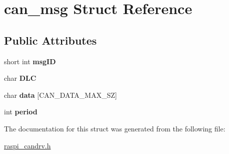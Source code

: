 \hypertarget{structcan__msg}{}\section{can\+\_\+msg Struct Reference}
\label{structcan__msg}
\subsection*{Public Attributes}
\begin{DoxyCompactItemize}
\item 
\hypertarget{structcan__msg_abde3c56b9f9aa29acf9b36df382b06bd}{}short int {\bfseries msg\+I\+D}\label{structcan__msg_abde3c56b9f9aa29acf9b36df382b06bd}

\item 
\hypertarget{structcan__msg_a7a0cd11dbedf7389a7c97b90f1aed6b7}{}char {\bfseries D\+L\+C}\label{structcan__msg_a7a0cd11dbedf7389a7c97b90f1aed6b7}

\item 
\hypertarget{structcan__msg_a09cd6aa06932f0df250b42ee64698f66}{}char {\bfseries data} \mbox{[}C\+A\+N\+\_\+\+D\+A\+T\+A\+\_\+\+M\+A\+X\+\_\+\+S\+Z\mbox{]}\label{structcan__msg_a09cd6aa06932f0df250b42ee64698f66}

\item 
\hypertarget{structcan__msg_ab09411ea13feb74787bc1c98d47e535f}{}int {\bfseries period}\label{structcan__msg_ab09411ea13feb74787bc1c98d47e535f}

\end{DoxyCompactItemize}


The documentation for this struct was generated from the following file\+:\begin{DoxyCompactItemize}
\item 
\hyperlink{raspi__candrv_8h}{raspi\+\_\+candrv.\+h}\end{DoxyCompactItemize}
